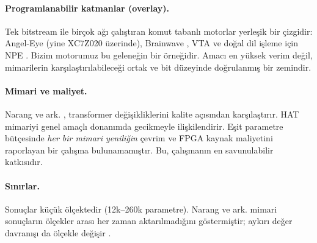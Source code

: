 \paragraph{Programlanabilir katmanlar (overlay).} Tek bitstream ile birçok ağı çalıştıran komut tabanlı motorlar
yerleşik bir çizgidir: Angel-Eye \cite{guo2018angeleye} (yine XC7Z020 üzerinde), Brainwave \cite{fowers2018brainwave},
VTA \cite{moreau2019vta} ve doğal dil işleme için NPE \cite{khan2021npe}. Bizim motorumuz bu geleneğin bir örneğidir.
Amacı en yüksek verim değil, mimarilerin karşılaştırılabileceği ortak ve bit düzeyinde doğrulanmış bir zemindir.

\paragraph{Mimari ve maliyet.} Narang ve ark. \cite{narang2021transformer}, transformer değişikliklerini kalite açısından
karşılaştırır. HAT \cite{wang2020hat} mimariyi genel amaçlı donanımda gecikmeyle ilişkilendirir. Eşit parametre
bütçesinde \emph{her bir mimari yeniliğin} çevrim ve FPGA kaynak maliyetini raporlayan bir çalışma bulunamamıştır. Bu,
çalışmanın en savunulabilir katkısıdır.

\paragraph{Sınırlar.} Sonuçlar küçük ölçektedir (12k--260k parametre). Narang ve ark. mimari sonuçların ölçekler arası
her zaman aktarılmadığını göstermiştir; aykırı değer davranışı da ölçekle değişir \cite{dettmers2022llmint8}.
